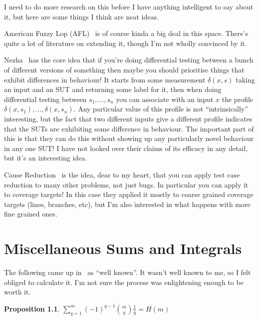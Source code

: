 \documentclass[a4paper]{book}
\newtheorem{proposition}{Proposition}
\begin{document}
I need to do more research on this before I have anything intelligent to say about it,
but here are some things I think are neat ideas.

American Fuzzy Lop (AFL)~\cite{AFL} is of course kinda a big deal in this space.
There's quite a lot of literature on extending it,
though I'm not wholly convinced by it.

Nezha~\cite{DBLP:conf/sp/PetsiosTSKJ17} has the core idea that if you're doing differential testing between a bunch of different versions of something then maybe you should prioritise things that exhibit differences in behaviour!
It starts from some measurement \(\delta(x, s)\) taking an input and an SUT and returning some label for it,
then when doing differential testing between \(s_1, \ldots, s_n\) you can associate with an input \(x\) the profile \(\delta(x, s_1), \ldots, \delta(x, s_n)\).
Any particular value of this profile is not ``intrinsically'' interesting,
but the fact that two different inputs give a different profile indicates that the SUTs are exhibiting some difference in behaviour.
The important part of this is that they can do this without showing up any particularly novel behaviour in any one SUT!\@
I have not looked over their claims of its efficacy in any detail,
but it's an interesting idea.

Cause Reduction~\cite{DBLP:journals/stvr/GroceAZCR16} is the idea,
dear to my heart,
that you can apply test case reduction to many other problems,
not just bugs.
In particular you can apply it to coverage targets!
In this case they applied it mostly to coarse grained coverage targets (lines, branches, etc),
but I'm also interested in what happens with more fine grained ones.

\chapter{Miscellaneous Sums and Integrals}

The following came up in~\cite{DBLP:journals/dam/FlajoletGT92} as ``well known''.
It wasn't well known to me,
so I felt obliged to calculate it.
I'm not sure the process was enlightening enough to be worth it.

\begin{proposition}
\(\sum\limits_{q = 1}^m {(-1)}^{q - 1} {m \choose q} \frac{1}{q} = H(m)\)
\end{proposition}
\end{document}
